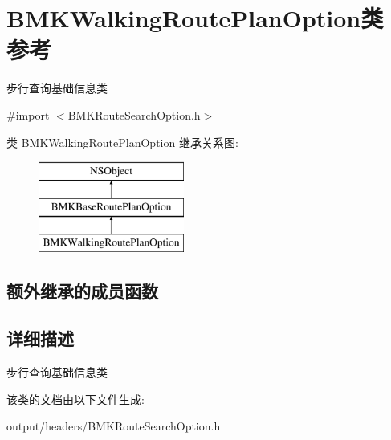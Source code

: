 \hypertarget{interface_b_m_k_walking_route_plan_option}{}\section{B\+M\+K\+Walking\+Route\+Plan\+Option类 参考}
\label{interface_b_m_k_walking_route_plan_option}


步行查询基础信息类  




{\ttfamily \#import $<$B\+M\+K\+Route\+Search\+Option.\+h$>$}

类 B\+M\+K\+Walking\+Route\+Plan\+Option 继承关系图\+:\begin{figure}[H]
\begin{center}
\leavevmode
\includegraphics[height=3.000000cm]{interface_b_m_k_walking_route_plan_option}
\end{center}
\end{figure}
\subsection*{额外继承的成员函数}


\subsection{详细描述}
步行查询基础信息类 

该类的文档由以下文件生成\+:\begin{DoxyCompactItemize}
\item 
output/headers/B\+M\+K\+Route\+Search\+Option.\+h\end{DoxyCompactItemize}
